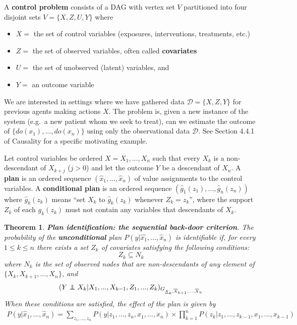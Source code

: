 \documentclass[11pt]{article}
\numberwithin{equation}{section}
\newcommand\indep{\protect\mathpalette{\protect\independenT}{\perp}}
\def\independenT#1#2{\mathrel{\rlap{$#1#2$}\mkern2mu{#1#2}}}
\newtheorem{thm}{Theorem}[section]
\begin{document}
A \textbf{control problem}  consists of a DAG with vertex set $V$ partitioned into four disjoint sets $V=\{X,Z,U,Y\}$ where
\begin{itemize}
\item $X=$ the set of control variables (exposures, interventions, treatments, etc.)
\item $Z=$ the set of observed variables, often called \textbf{covariates}
\item $U=$ the set of unobserved (latent) variables, and
\item $Y=$ an outcome variable
\end{itemize}
We are interested in settings where we have gathered data $\mathcal{D}=\{X,Z,Y\}$ for previous agents making actions $X$. The problem is, given a new instance of the system (e.g.\ a new patient whom we seek to treat), can we estimate the outcome of $\{do(x_1),...,do(x_n)\}$ using only the observational data $\mathcal{D}$. See Section 4.4.1 of Causality for a specific motivating example.

Let control variables be ordered $X=X_1,...,X_n$ such that every $X_k$ is a non-descendant of $X_{k+j}$ ($j>0$) and let the outcome $Y$ be a descendant of $X_n$. A \textbf{plan} is an ordered sequence $(\hat{x}_1,...,\hat{x}_n)$ of value assignments to the control variables. A \textbf{conditional plan} is an ordered sequence $(\hat{g}_1(z_1),...,\hat{g}_n(z_n))$ where $\hat{g}_k(z_k)$ means ``set $X_k$ to $\hat{g}_k(z_k)$ whenever $Z_k=z_k$'', where the support $Z_k$ of each $g_k(z_k)$ must not contain any variables that descendants of $X_k$.

\begin{thm}
\textbf{Plan identification: the sequential back-door criterion}. The probability of the \textbf{unconditional} plan $P(y|\hat{x_1}, ..., \hat{x}_n)$ is identifiable if, for every $1 \leq k \leq n$ there exists a set $Z_k$ of covariates satisfying the following conditions:
\begin{equation}
Z_k \subseteq N_k
\end{equation}
where $N_k$ is the set of observed nodes that are non-descendants of any element of $\{X_k, X_{k+1},...,X_n\}$, and
\begin{align}
(Y \indep X_k | X_1,...,X_{k-1},Z_1,...,Z_k)_{{G_{\underline{X}_k,\overline{X}_{k+1},...,\overline{X}_{n}}}}
\end{align}
When these conditions are satisfied, the effect of the plan is given by
\begin{align}
P(y|\hat{x}_1,...,\hat{x}_n) = \sum_{z_1,...,z_n} P(y|z_1,...,z_n,x_1,...,x_n) \times \prod_{k=1}^n P(z_k|z_1,...,z_{k-1},x_1,...,x_{k-1})
\end{align}
\end{thm}
\end{document}

